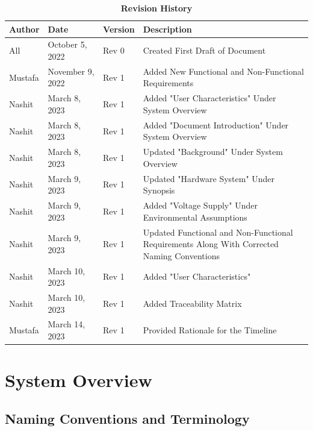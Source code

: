 \documentclass[12pt, titlepage]{article}
\begin{document}
\vspace{20pt}
\begin{center}
\begin{table}[H]
\caption{\bf Revision History}
    \begin{tabular}{p{2cm}p{3cm}p{2cm}p{6cm}}
    \hline
    \bf Author & \bf Date & \bf Version & \bf Description\\
    \hline
    All & October 5, 2022 & Rev 0 & Created First Draft of Document\\
    \hline
    Mustafa & November 9, 2022 & Rev 1 & Added New Functional and Non-Functional Requirements\\
    \hline
    Nashit & March 8, 2023 & Rev 1 & Added "User Characteristics" Under System Overview\\
    \hline
    Nashit & March 8, 2023 & Rev 1 & Added "Document Introduction" Under System Overview\\
    \hline
    Nashit & March 8, 2023 & Rev 1 & Updated "Background" Under System Overview\\
    \hline
    Nashit & March 9, 2023 & Rev 1 & Updated "Hardware System" Under Synopsis\\
    \hline
    Nashit & March 9, 2023 & Rev 1 & Added "Voltage Supply" Under Environmental Assumptions\\
    \hline
    Nashit & March 9, 2023 & Rev 1 & Updated Functional and Non-Functional Requirements Along With Corrected Naming Conventions\\
    \hline
    Nashit & March 10, 2023 & Rev 1 & Added "User Characteristics"\\
    \hline
    Nashit & March 10, 2023 & Rev 1 & Added Traceability Matrix\\
    \hline
    Mustafa & March 14, 2023 & Rev 1 & Provided Rationale for the Timeline\\
    \hline
    \end{tabular}
\end{table}
\end{center}

\newpage


\section{System Overview}

\subsection{Naming Conventions and Terminology}
\end{document}
